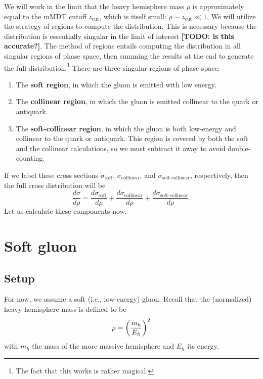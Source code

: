 \documentclass[../thesis.tex]{subfiles}
\providecommand{\zcut}{z_\mathrm{{cut}}}
\begin{document}
	We will work in the limit that the heavy hemisphere mass $\rho$ is approximately equal to the mMDT cutoff $\zcut$, which is itself small: $\rho \sim \zcut \ll 1$. We will utilize the strategy of regions \cite{becher_introduction_2015-1} to compute the distribution. This is necessary because the distribution is essentially singular in the limit of interest {\color{red}\textbf{[TODO: is this accurate?]}}. The method of regions entails computing the distribution in all singular regions of phase space, then summing the results at the end to generate the full distribution.\footnote{The fact that this works is rather magical.} There are three singular regions of phase space:
	\begin{enumerate}
		\item The \textbf{soft region}, in which the gluon is emitted with low energy.

		\item The \textbf{collinear region}, in which the gluon is emitted collinear to the quark or antiquark.

		\item The \textbf{soft-collinear region}, in which the gluon is both low-energy and collinear to the quark or antiquark. This region is covered by both the soft and the collinear calculations, so we must subtract it away to avoid double-counting.
	\end{enumerate}
	If we label these cross sections $\sigma_\text{soft}$, $\sigma_\text{collinear}$, and $\sigma_\text{soft-collinear}$, respectively, then the full cross distribution will be
	\begin{equation}
		\frac{d\sigma}{d\rho} = \frac{d\sigma_\text{soft}}{d\rho} + \frac{d\sigma_\text{collinear}}{d\rho} + \frac{d\sigma_\text{soft-collinear}}{d\rho}.
	\end{equation}
	Let us calculate these components now.

\section{Soft gluon}
\subsection{Setup}
	For now, we assume a soft (i.e., low-energy) gluon. Recall that the (normalized) heavy hemisphere mass is defined to be
	\begin{equation}
		\rho = \qty(\frac{m_h}{E_h})^2
	\end{equation}
	with $m_h$ the mass of the more massive hemisphere and $E_h$ its energy.
\end{document}
